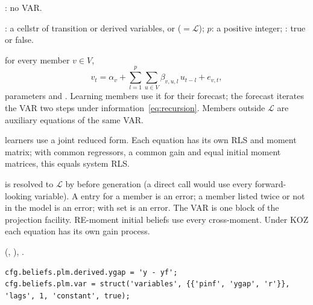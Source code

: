 \documentclass[11pt,a4paper]{article}
\DeclareRobustCommand{\codem}[1]{\texttt{\detokenize{#1}}}
\newenvironment{optspec}%
  {\begin{description}[style=sameline,leftmargin=2.7cm,labelwidth=2.5cm,font=\normalfont\itshape]}%
  {\end{description}}
\begin{document}
\subsubsection{\texorpdfstring{\codem{beliefs.plm.var}}{beliefs.plm.var}}\label{opt:beliefs-plm-var}
\begin{optspec}
  \item[Default] : no VAR.
  \item[Values] : a cellstr of transition or derived variables, or
         ($=\mathcal{L}$);  $p$: a positive integer; :
        true or false.
  \item[Math] for every member $v\in V$,
        \begin{equation}\label{eq:var}
          v_t = \alpha_v + \sum_{l=1}^{p}\sum_{u\in V} \beta_{v,u,l}\, u_{t-l} + e_{v,t},
        \end{equation}
        parameters  and . Learning members use it for their
        forecast; the forecast iterates the VAR two steps under 
        information~\eqref{eq:recursion}. Members outside $\mathcal{L}$ are auxiliary
        equations of the same VAR.
  \item[Assumptions] learners use a joint reduced form. Each equation has its own RLS and
        moment matrix; with common regressors, a common gain and equal initial moment
        matrices, this equals system RLS.
  \item[Interactions]  is resolved to $\mathcal{L}$ by
         before generation (a direct
         call would use every forward-looking variable). A
         entry for a member is an error; a member listed twice or not in the model
        is an error;  with  set is an error. The VAR is
        one block of the projection facility. RE-moment initial beliefs use every
        cross-moment. Under KOZ  each equation has its own gain process.
  \item[Code]  (, ),
        .
  \item[Example]
\begin{lstlisting}
cfg.beliefs.plm.derived.ygap = 'y - yf';
cfg.beliefs.plm.var = struct('variables', {{'pinf', 'ygap', 'r'}}, 'lags', 1, 'constant', true);
\end{lstlisting}
\end{optspec}
\end{document}
